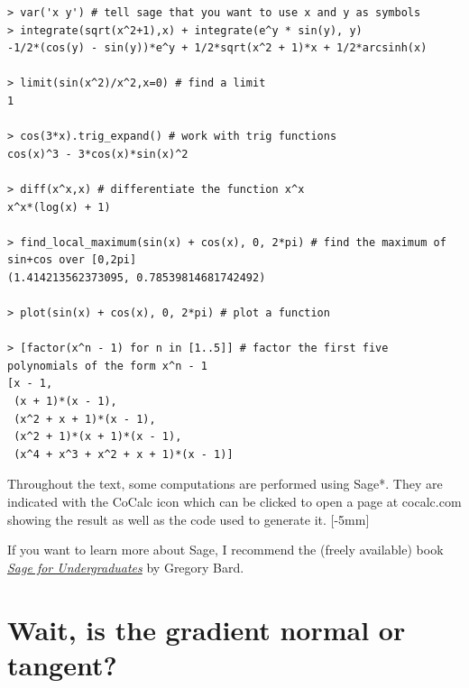 \documentclass[svgnames]{watsonbook}
\begin{document}
\begin{lstlisting}
> var('x y') # tell sage that you want to use x and y as symbols
> integrate(sqrt(x^2+1),x) + integrate(e^y * sin(y), y)
-1/2*(cos(y) - sin(y))*e^y + 1/2*sqrt(x^2 + 1)*x + 1/2*arcsinh(x)

> limit(sin(x^2)/x^2,x=0) # find a limit
1

> cos(3*x).trig_expand() # work with trig functions
cos(x)^3 - 3*cos(x)*sin(x)^2

> diff(x^x,x) # differentiate the function x^x
x^x*(log(x) + 1)

> find_local_maximum(sin(x) + cos(x), 0, 2*pi) # find the maximum of sin+cos over [0,2pi]
(1.414213562373095, 0.78539814681742492)

> plot(sin(x) + cos(x), 0, 2*pi) # plot a function

> [factor(x^n - 1) for n in [1..5]] # factor the first five polynomials of the form x^n - 1
[x - 1,
 (x + 1)*(x - 1),
 (x^2 + x + 1)*(x - 1),
 (x^2 + 1)*(x + 1)*(x - 1),
 (x^4 + x^3 + x^2 + x + 1)*(x - 1)]
\end{lstlisting}

Throughout the text, some computations are performed using Sage*. They
are indicated with the CoCalc icon
\href{http://cocalc.com}{\cocalc} which can be clicked to
open a page at cocalc.com showing the result as well as the
code used to generate it. [-5mm]

If you want to learn more about Sage, I recommend the (freely
available) book
\href{http://www.gregorybard.com/Sage.html}{\textit{Sage for
    Undergraduates}} by Gregory Bard.

\newpage

\section{Wait, is the gradient normal or
  tangent?} \label{sec:gradienta}
\end{document}
